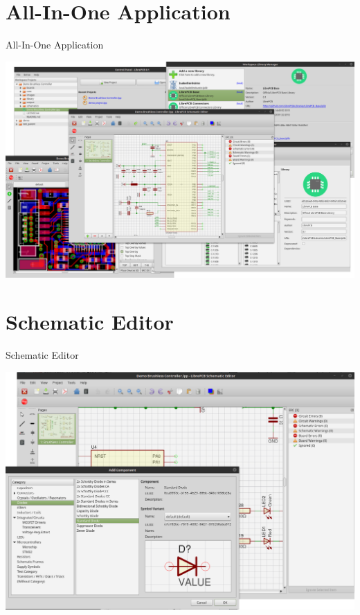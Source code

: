 \documentclass[aspectratio=1610,t]{beamer}
\begin{document}

\section{All-In-One Application}

\begin{frame}{All-In-One Application}
	\begin{center}
		\includegraphics[width=0.8\paperwidth]{images/overview.png}
	\end{center}
\end{frame}


\section{Schematic Editor}

\begin{frame}{Schematic Editor}
	\begin{center}
		\includegraphics[width=0.7\paperwidth]{images/schematic_editor.png}
	\end{center}
\end{frame}
\end{document}
